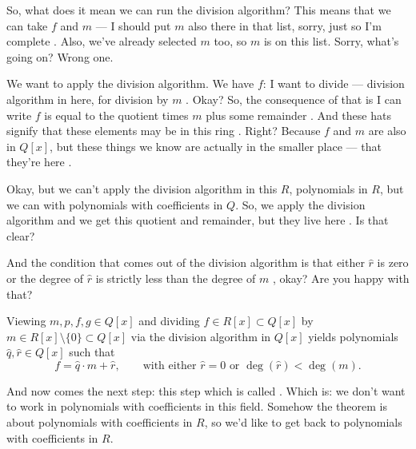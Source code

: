 \begin{proofWrapper}
\begin{speech}[00:20:58 - 00:23:05]
So, what does it mean we can run the division algorithm? This means that we can take $f$ and $m$ --- I should put $m$ also there in that list, sorry, just so I'm complete . Also, we've already selected $m$ too, so $m$ is on this list. Sorry, what's going on? Wrong one.

We want to apply the division algorithm. We have $f$: I want to divide --- division algorithm in here, for division by $m$ . Okay? So, the consequence of that is I can write $f$ is equal to the quotient times $m$ plus some remainder . And these hats signify that these elements may be in this ring . Right? Because $f$ and $m$ are also in $Q[x]$, but these things we know are actually in the smaller place --- that they're here .

Okay, but we can't apply the division algorithm in this $R$, polynomials in $R$, but we can with polynomials with coefficients in $Q$. So, we apply the division algorithm and we get this quotient and remainder, but they live here . Is that clear?

And the condition that comes out of the division algorithm is that either $\hat{r}$ is zero or the degree of $\hat{r}$ is strictly less than the degree of $m$ , okay? Are you happy with that?
\end{speech}

\begin{content}[{Division of $f$ by $m$ in $Q[x]$}]
Viewing $m, p, f, g \in Q[x]$ and dividing $f \in R[x] \subset Q[x]$ by $m \in R[x] \setminus \{0\} \subset Q[x]$ via the division algorithm in $Q[x]$ yields polynomials $\hat{q}, \hat{r} \in Q[x]$ such that
\begin{equation}\label{eq:div-f-qhat}
f = \hat{q} \cdot m + \hat{r}, \qquad \text{with either } \hat{r} = 0 \text{ or } \deg(\hat{r}) < \deg(m).
\end{equation}
\end{content}

\begin{speech}[00:23:05 - 00:25:01]
And now comes the next step: this step which is called  . Which is: we don't want to work in polynomials with coefficients in this field. Somehow the theorem is about polynomials with coefficients in $R$, so we'd like to get back to polynomials with coefficients in $R$.


\end{speech}
\end{proofWrapper}
